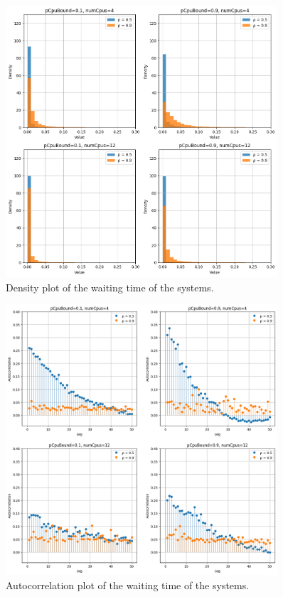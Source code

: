 \begin{figure}[H]
    \captionsetup{type=figure}
    \centering
    \includegraphics[width=0.9\textwidth]{./images/04/sjf/wait/density.png}
    \caption{Density plot of the waiting time of the systems.}
    \label{fig:sjfWaitDensity}
\end{figure}

\begin{figure}[H]
    \captionsetup{type=figure}
    \centering
    \includegraphics[width=0.9\textwidth]{./images/04/sjf/wait/autocorrelation.png}
    \caption{Autocorrelation plot of the waiting time of the systems.}
    \label{fig:sjfWaitAutocorrelation}
\end{figure}

